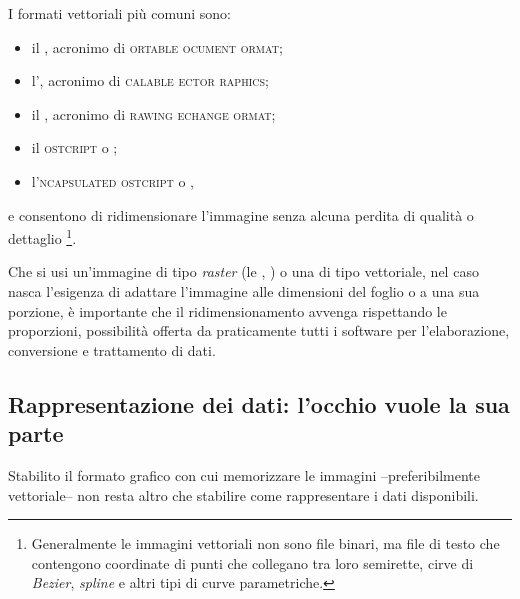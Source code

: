 I formati vettoriali più comuni sono:
\begin{itemize}
 \item il , acronimo di \textsc{ortable ocument ormat};
 \item l', acronimo di \textsc{calable ector raphics};
 \item il , acronimo di \textsc{rawing echange ormat};
 \item il \textsc{ostcript} o ;
 \item l'\textsc{ncapsulated ostcript} o ,
\end{itemize}
e consentono di ridimensionare l'immagine senza alcuna perdita di qualità o dettaglio%
\footnote{Generalmente le immagini vettoriali non sono file binari, ma file di testo che contengono coordinate di punti che collegano tra loro semirette, cirve di \textit{Bezier}, \textit{spline} e altri tipi di curve parametriche.}.

Che si usi un'immagine di tipo \textit{raster} (le ,  \ecc) o una di tipo vettoriale, nel caso nasca l'esigenza di adattare l'immagine alle dimensioni del foglio o a una sua porzione, è importante che il ridimensionamento avvenga rispettando le proporzioni, possibilità offerta da praticamente tutti i software per l'elaborazione, conversione e trattamento di dati.


					\subsection{Rappresentazione dei dati: l'occhio vuole la sua parte}

Stabilito il formato grafico con cui memorizzare le immagini --preferibilmente vettoriale-- non resta altro che stabilire come rappresentare i dati disponibili.

